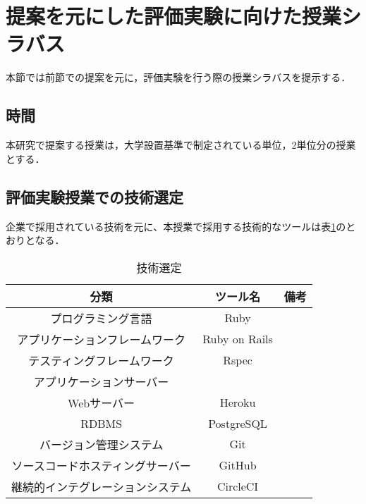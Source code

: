 \section{提案を元にした評価実験に向けた授業シラバス}

本節では前節での提案を元に，評価実験を行う際の授業シラバスを提示する．

\subsection{時間}

本研究で提案する授業は，大学設置基準\cite{univ_criteria}で制定されている単位，2単位分の授業とする．

%

\subsection{評価実験授業での技術選定}

企業で採用されている技術を元に、本授業で採用する技術的なツールは表\ref{tab:技術選定}のとおりとなる．

\begin{table}[ht]
  \begin{center}
    \caption{技術選定}
    \begin{tabular}{|c|c|c|}
      \hline
      分類 & ツール名 & 備考 \\
      \hline
      プログラミング言語 & Ruby & \\
      \hline
      アプリケーションフレームワーク & Ruby on Rails & \\
      \hline
      テスティングフレームワーク & Rspec & \\
      \hline
      アプリケーションサーバー &  & \\
      \cline{1-1}\cline{3-3}
      Webサーバー & Heroku & \\
      \hline
      RDBMS & PostgreSQL & \\
      \hline
      バージョン管理システム & Git & \\
      \hline
      ソースコードホスティングサーバー & GitHub & \\
      \hline
      継続的インテグレーションシステム & CircleCI & \\
      \hline
    \end{tabular}
    \label{tab:技術選定}
  \end{center}
\end{table}

